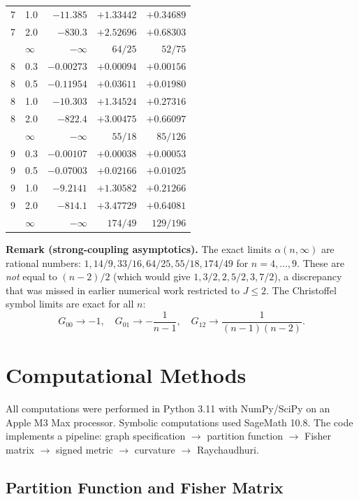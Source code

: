 \documentclass[11pt]{article}
\theoremstyle{definition}
\theoremstyle{remark}
\begin{document}
\begin{table}[ht]
\begin{tabular}{llrrr}
7 & 1.0 & $-11.385$ & $+1.33442$ & $+0.34689$ \\
7 & 2.0 & $-830.3$ & $+2.52696$ & $+0.68303$ \\
& $\infty$ & $-\infty$ & $64/25$ & $52/75$ \\
\midrule
8 & 0.3 & $-0.00273$ & $+0.00094$ & $+0.00156$ \\
8 & 0.5 & $-0.11954$ & $+0.03611$ & $+0.01980$ \\
8 & 1.0 & $-10.303$ & $+1.34524$ & $+0.27316$ \\
8 & 2.0 & $-822.4$ & $+3.00475$ & $+0.66097$ \\
& $\infty$ & $-\infty$ & $55/18$ & $85/126$ \\
\midrule
9 & 0.3 & $-0.00107$ & $+0.00038$ & $+0.00053$ \\
9 & 0.5 & $-0.07003$ & $+0.02166$ & $+0.01025$ \\
9 & 1.0 & $-9.2141$ & $+1.30582$ & $+0.21266$ \\
9 & 2.0 & $-814.1$ & $+3.47729$ & $+0.64081$ \\
& $\infty$ & $-\infty$ & $174/49$ & $129/196$ \\
\bottomrule
\end{tabular}
\end{table}

\textbf{Remark (strong-coupling asymptotics).}
The exact limits $\alpha(n,\infty)$ are rational numbers: $1, 14/9, 33/16, 64/25, 55/18, 174/49$
for $n=4,\ldots,9$. These are \emph{not} equal to $(n-2)/2$ (which would give $1, 3/2, 2, 5/2, 3, 7/2$),
a discrepancy that was missed in earlier numerical work restricted to $J\leq 2$.
The Christoffel symbol limits are exact for all $n$:
\begin{equation}
  G_{00} \to -1, \quad G_{01} \to -\frac{1}{n-1}, \quad G_{12} \to \frac{1}{(n-1)(n-2)}.
\end{equation}

\section{Computational Methods}
\label{app:computation}

All computations were performed in Python 3.11 with NumPy/SciPy on an
Apple M3 Max processor. Symbolic computations used SageMath 10.8. The
code implements a pipeline: graph specification $\to$ partition function
$\to$ Fisher matrix $\to$ signed metric $\to$ curvature $\to$ Raychaudhuri.

\subsection{Partition Function and Fisher Matrix}
\end{document}

